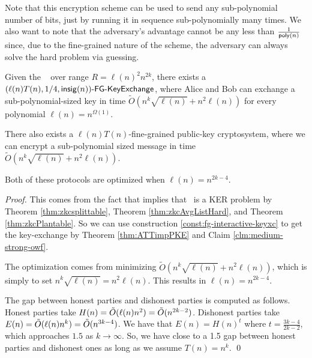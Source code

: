 Note that this encryption scheme can be used to send any sub-polynomial number of bits, just by running it in sequence sub-polynomially many times. %
 We also want to note that the adversary's advantage cannot be any less than $\frac{1}{ \poly(n)}$ since, due to the fine-grained nature of the scheme, the adversary can always solve the hard problem via guessing.


\begin{corollary}
	Given the \strongzkc~ over range $R = \ell(n)^2 n^{2k}$, there exists a\\ $\fgkeyxc{\ell(n)T(n)}{1/4}{\insig(n)}$, where Alice and Bob can exchange a sub-polynomial-sized key in time $\tilde{O}\left(n^{k}\sqrt{\ell(n)} + n^2\ell(n)\right)$ for every polynomial $\ell(n)= n ^{\Omega(1)}$.
	
	There also exists a $\ell(n)T(n)$-fine-grained public-key cryptosystem, where we can encrypt a sub-polynomial sized message in time $\tilde{O}\left(n^{k}\sqrt{\ell(n)} + n^2\ell(n)\right)$.
	
	Both of these protocols are optimized when $\ell(n) = n^{2k-4}$.
	\label{cor:kcliqueKeyExchange}
\end{corollary}
\begin{proof}
	This comes from the fact that \strongzkc implies that \zkclique~is a KER problem by Theorem \ref{thm:zkcsplittable}, Theorem \ref{thm:zkcAvgListHard}, and Theorem \ref{thm:zkcPlantable}.  So we can use construction \ref{const:fg-interactive-keyxc} to get the key-exchange by Theorem \ref{thm:ATTimpPKE} and Claim \ref{clm:medium-strong-owf}. %
	
	The optimization comes from minimizing $\tilde{O}\left(n^{k}\sqrt{\ell(n)} + n^2\ell(n)\right)$, which is simply to set $n^k \sqrt{\ell(n)} = n^2 \ell(n)$. This results in $\ell(n) = n^{2k - 4}$.
	
	The gap between honest parties and dishonest parties is computed as follows. Honest parties take $H(n) = \~O(\ell(n)n^2) = \~O(n^{2k - 2})$. Dishonest parties take $E(n) = \~O(\ell(n)n^k) = \~O(n^{3k - 4})$. We have that $E(n) = H(n)^t$ where $t = \frac{3k-4}{2k-2}$, which approaches $1.5$ as $k \to \infty$. So, we have close to a 1.5 gap between honest parties and dishonest ones as long as we assume $T(n) = n^{k}$.
	\qed
\end{proof}

